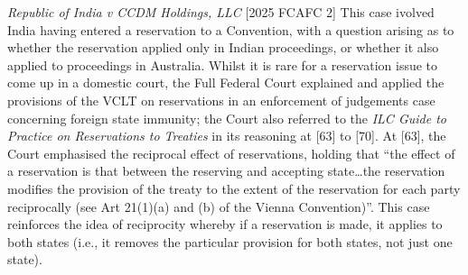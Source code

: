 \begin{casedetails}{\textit{Republic of India v CCDM Holdings, LLC} [2025 FCAFC 2]}
    \flushleft
    This case ivolved India having entered a reservation to a Convention, with a question arising as to whether the reservation applied only in Indian proceedings, or whether it also applied to proceedings in Australia. Whilst it is rare for a reservation issue to come up in a domestic court, the Full Federal Court explained and applied the provisions of the VCLT on reservations in an enforcement of judgements case concerning foreign state immunity; the Court also referred to the \textit{ILC Guide to Practice on Reservations to Treaties} in its reasoning at [63] to [70]. At [63], the Court emphasised the reciprocal effect of reservations, holding that ``the effect of a reservation is that between the reserving and accepting state…the reservation modifies the provision of the treaty to the extent of the reservation for each party reciprocally (see Art 21(1)(a) and (b) of the Vienna Convention)''. This case reinforces the idea of reciprocity whereby if a reservation is made, it applies to both states (i.e., it removes the particular provision for both states, not just one state).
\end{casedetails}

